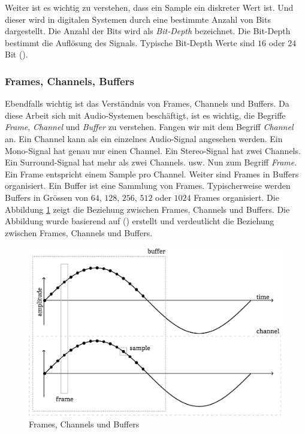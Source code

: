 \documentclass[11pt,a4paper]{article}
\begin{document}
\noindent \newline
Weiter ist es wichtig zu verstehen, dass ein Sample ein diskreter Wert ist. Und dieser wird in
digitalen Systemen durch eine bestimmte Anzahl von Bits dargestellt. Die Anzahl der Bits wird
als \textit{Bit-Depth} bezeichnet. Die Bit-Depth bestimmt die Auflösung des Signals. Typische
Bit-Depth Werte sind \(16\) oder \(24\) Bit (\cite[p.10]{somberg2019audioapi}).

\subsubsection{Frames, Channels, Buffers}
Ebendfalls wichtig ist das Verständnis von Frames, Channels und Buffers. Da diese Arbeit sich mit
Audio-Systemen beschäftigt, ist es wichtig, die Begriffe \textit{Frame}, \textit{Channel} und
\textit{Buffer} zu verstehen. Fangen wir mit dem Begriff \textit{Channel} an. Ein Channel kann als
ein einzelnes Audio-Signal angesehen werden. Ein Mono-Signal hat genau nur einen Channel. Ein
Stereo-Signal hat zwei Channels. Ein Surround-Signal hat mehr als zwei Channels. usw.
Nun zum Begriff \textit{Frame}. Ein Frame entspricht einem Sample pro Channel. Weiter sind Frames
in Buffers organisiert. Ein Buffer ist eine Sammlung von Frames. Typischerweise werden Buffers in
Grössen von \(64\), \(128\), \(256\), \(512\) oder \(1024\) Frames organisiert. Die Abbildung
\ref{fig:frames_channels_buffers} zeigt die Beziehung zwischen Frames, Channels und Buffers.
Die Abbildung wurde basierend auf (\cite[p.10]{somberg2019audioapi}) erstellt und verdeutlicht die
Beziehung zwischen Frames, Channels und Buffers.

\begin{figure}[h]
	\centering
	\includegraphics[width=0.7\linewidth]{img/audio-nutshell.pdf}
	\caption{Frames, Channels und Buffers}
	\label{fig:frames_channels_buffers}
\end{figure}
\end{document}
